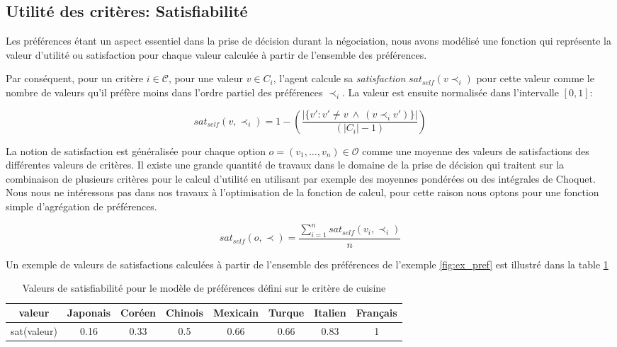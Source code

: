 \subsection{Utilité des critères: Satisfiabilité}

Les préférences étant un aspect essentiel dans la prise de décision durant la négociation, nous avons modélisé une fonction qui représente la valeur d'utilité ou satisfaction pour chaque valeur calculée à partir de l'ensemble des préférences. 

Par conséquent, pour un critère $i\in \mathcal{C}$, pour une valeur $v\in C_i$, l'agent calcule sa \emph{satisfaction} $sat_{self}(v \prec_i)$ pour cette valeur comme le nombre de valeurs qu'il préfère moins dans l'ordre partiel des préférences $\prec_i$. La valeur est ensuite normalisée dans l'intervalle $[0,1]$:

\begin{equation}
sat_{self}(v, \prec_i) =	1 - \left( \frac{|\{v' : v' \neq v \  \wedge \ (v \prec_i v')\}| }{( |C_i| - 1 )}\right)
\end{equation}

La notion de satisfaction est généralisée pour chaque option $ o= (v_1, \ldots, v_n) \in \mathcal{O}$ comme une moyenne des valeurs de satisfactions des différentes valeurs de critères. Il existe une grande quantité de travaux  dans le domaine de la prise de décision  qui traitent sur la combinaison de plusieurs critères pour le calcul d'utilité en utilisant par exemple des moyennes pondérées ou des intégrales de Choquet. Nous nous ne intéressons pas dans nos travaux à l'optimisation de la fonction de calcul, pour cette raison nous optons pour une fonction simple d'agrégation de préférences.

\begin{equation}
sat_{self}(o, \prec) = \frac{\sum_{i=1}^{n} sat_{self}(v_i, \prec_i) }{n}
\end{equation}

Un exemple de valeurs de satisfactions calculées à partir de l'ensemble des préférences de l'exemple \ref{fig:ex_pref} est illustré dans la table \ref{tab:sat}
\begin{table}[h]
	\centering
	{\scriptsize
		\begin{tabular}{ |c|c|c|c|c|c|c|c| }
			\hline				
			valeur & Japonais & Coréen & Chinois &  Mexicain & Turque & Italien & Français \\
			\hline
			
			sat(valeur) & 0.16 & 0.33 & 0.5 & 0.66 & 0.66 & 0.83 & 1\\
			\hline
			
	\end{tabular}}
	\caption{Valeurs de satisfiabilité pour le modèle de préférences défini sur le critère de cuisine}
	\label{tab:sat}
\end{table}

